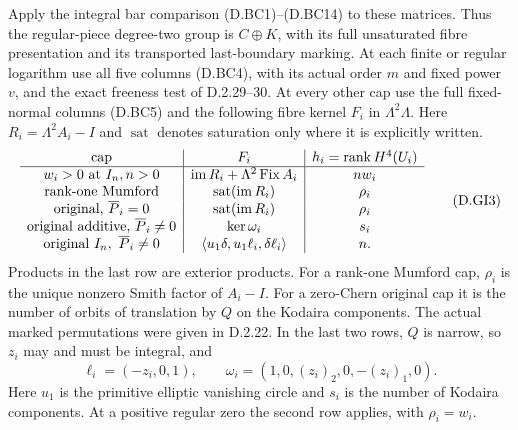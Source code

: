 Apply the integral bar comparison (D.BC1)--(D.BC14) to these
matrices. Thus the regular-piece degree-two group is
$C\oplus K$, with its full unsaturated fibre presentation
and its transported last-boundary marking. At each finite or
regular logarithm use all five columns (D.BC4), with its
actual order $m$ and fixed power $v$, and the exact freeness
test of D.2.29--30. At every other cap use the full fixed-normal
columns (D.BC5) and the following fibre kernel $F_i$ in
$\Lambda^2\Lambda$. Here $R_i=\Lambda^2A_i-I$ and
$\operatorname{sat}$ denotes saturation only where it is
explicitly written.
\[
\begin{array}{c|c|c}
\hbox{cap}&F_i& h_i=\operatorname{rank}H^4(U_i)\\ \hline
w_i>0\hbox{ at }I_n, n>0&
 \operatorname{im}R_i+\Lambda^2\operatorname{Fix}A_i&nw_i\\
\hbox{rank-one Mumford}&\operatorname{sat}(\operatorname{im}R_i)&\rho_i\\
\hbox{original, }\overline P_i=0&
 \operatorname{sat}(\operatorname{im}R_i)&\rho_i\\
\hbox{original additive, }\overline P_i\ne0&\ker\omega_i&s_i\\
\hbox{original }I_n,\ \overline P_i\ne0&
 \langle u_1\delta,u_1\ell_i,\delta\ell_i\rangle&n .
\end{array}                                                \tag{D.GI3}
\]
Products in the last row are exterior products.
For a rank-one Mumford cap, $\rho_i$ is the unique nonzero
Smith factor of $A_i-I$. For a zero-Chern original cap it is
the number of orbits of translation by $Q$ on the Kodaira
components. The actual marked permutations were given in
D.2.22. In the last two rows, $Q$ is narrow, so $z_i$ may
and must be integral, and
\[
 \ell_i=(-z_i,0,1),\qquad
 \omega_i=(1,0,(z_i)_2,0,-(z_i)_1,0).
                                                               \tag{D.GI4}
\]
Here $u_1$ is the primitive elliptic vanishing circle and
$s_i$ is the number of Kodaira components. At a positive
regular zero the second row applies, with $\rho_i=w_i$.

